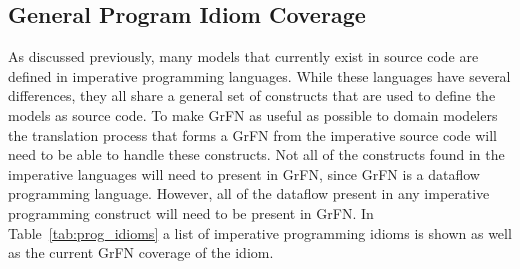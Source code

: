 \subsection{General Program Idiom Coverage\label{sec:supported_program_constructs}}
As discussed previously, many models that currently exist in source code are defined in imperative programming languages.
While these languages have several differences, they all share a general set of constructs that are used to define the models as source code.
To make GrFN as useful as possible to domain modelers the translation process that forms a GrFN from the imperative source code will need to be able to handle these constructs.
Not all of the constructs found in the imperative languages will need to present in GrFN, since GrFN is a dataflow programming language.
However, all of the dataflow present in any imperative programming construct will need to be present in GrFN.
In Table~\ref{tab:prog_idioms} a list of imperative programming idioms is shown as well as the current GrFN coverage of the idiom.

